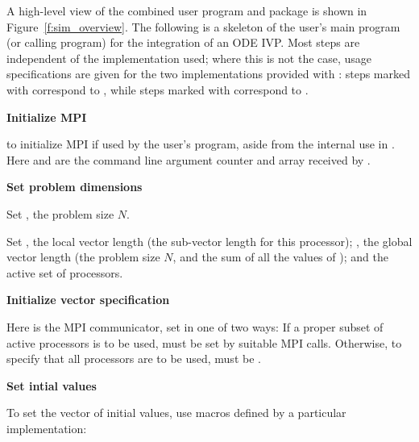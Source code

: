 A high-level view of the combined user program and {\cvodes} package is
shown in Figure~\ref{f:sim_overview}.
The following is a skeleton of the user's main program (or calling
program) for the integration of an ODE IVP. Most steps are independent of the {\nvector}
implementation used; where this is not the case, usage specifications are given for the
two implementations provided with {\cvodes}: steps marked with {\p} correspond to 
{\nvecp}, while steps marked with {\s} correspond to {\nvecs}.
%
\begin{Steps}
  
\item 
  {\bf Initialize MPI}

  {\p}  to initialize MPI if used by
  the user's program, aside from the internal use in {\nvecp}.  
  Here  and  are the command line argument 
  counter and array received by .
  
\item
  {\bf Set problem dimensions}

  {\s} Set , the problem size $N$.

  {\p} Set , the local vector length (the sub-vector
  length for this processor); , the global vector length (the
  problem size $N$, and the sum of all the values of );
  and the active set of processors.
  
\item
  {\bf Initialize vector specification}

  {\s} 

  {\p} 
  Here  is the MPI communicator, set in one of two ways: 
  If a proper subset of active processors is to be used,  
  must be set by suitable MPI calls. Otherwise, to specify that all 
  processors are to be used,  must be .
  
\item
  {\bf Set intial values}
 
  To set the vector  of initial values, use macros defined by a particular 
  {\nvector} implementation:


\end{Steps}
